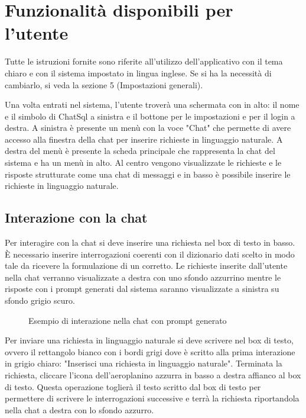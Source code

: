 \section{Funzionalità disponibili per l'utente}
\label{sec:sezUtente}

Tutte le istruzioni fornite sono riferite all'utilizzo dell'applicativo con il tema chiaro e con il sistema impostato in lingua inglese. Se si ha la necessità di cambiarlo, si veda la sezione 5 (Impostazioni generali).

Una volta entrati nel sistema, l'utente troverà una schermata con in alto: il nome e il simbolo di ChatSql a sinistra e il bottone per le impostazioni e per il login a destra. A sinistra è presente un menù con la voce "Chat" che permette di avere accesso alla finestra della chat per inserire richieste in linguaggio naturale. A destra del menù è presente la scheda principale che rappresenta la chat del sistema e ha un menù in alto. Al centro vengono visualizzate le richieste e le risposte strutturate come una chat di messaggi e in basso è possibile inserire le richieste in linguaggio naturale.

\subsection{Interazione con la chat}

Per interagire con la chat si deve inserire una richiesta nel box di testo in basso. È necessario inserire interrogazioni coerenti con il dizionario dati scelto in modo tale da ricevere la formulazione di un  corretto. Le richieste inserite dall'utente nella chat verranno visualizzate a destra con uno sfondo azzurrino mentre le risposte con i prompt generati dal sistema saranno visualizzate a sinistra su sfondo grigio scuro.

\begin{figure}[H]
  \centering
  \caption{Esempio di interazione nella chat con prompt generato}
\end{figure}

Per inviare una richiesta in linguaggio naturale si deve scrivere nel box di testo, ovvero il rettangolo bianco con i bordi grigi dove è scritto alla prima interazione in grigio chiaro: "Inserisci una richiesta in linguaggio naturale". Terminata la richiesta, cliccare l'icona dell'aeroplanino azzurra in basso a destra affianco al box di testo. Questa operazione toglierà il testo scritto dal box di testo per permettere di scrivere le interrogazioni successive e terrà la richiesta riportandola nella chat a destra con lo sfondo azzurro.


